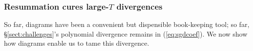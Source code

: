 {            %





            \subsubsection{Resummation cures large-$T$ divergences}\label{sect:resummation}
            So far, diagrams have been a convenient but dispensible
            book-keeping tool; so far, \S\ref{sect:challenges}'s polynomial
            divergence remains in (\ref{eq:sgdcoef}).  We now show how
            diagrams enable us to tame this divergence.

}
